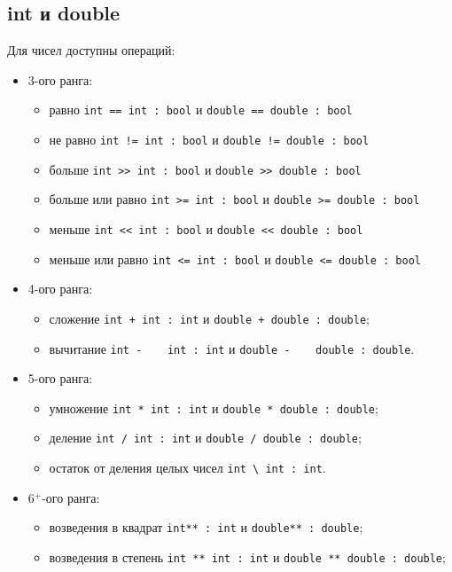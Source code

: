 \documentclass[a4paper, 14pt]{extarticle}
\newenvironment{icItems}
	{ \begin{itemize} [noitemsep,nolistsep] }
	{ \end{itemize} }
\begin{document}
\subsection{{\color{bluemarin}int} и {\color{bluemarin}double}}

	Для чисел доступны операций:
\begin{icItems}
	\item 3-ого ранга:
		\begin{icItems}
			\item равно \lstinline`int == int : bool` и \lstinline`double == double : bool`
			\item не равно \lstinline`int != int : bool` и \lstinline`double != double : bool`
			\item больше \lstinline`int >> int : bool` и \lstinline`double >> double : bool`
			\item больше или равно \lstinline`int >= int : bool` и \lstinline`double >= double : bool`
			\item меньше \lstinline`int << int : bool` и \lstinline`double << double : bool`
			\item меньше или равно \lstinline`int <= int : bool` и \lstinline`double <= double : bool`
		\end{icItems}
	\item 4-ого ранга:
		\begin{icItems}
			\item сложение \lstinline`int + int : int` и \lstinline`double + double : double`;
			\item вычитание \lstinline`int -    int : int` и \lstinline`double -    double : double`.
		\end{icItems}
	\item 5-ого ранга:
		\begin{icItems}
			\item умножение \lstinline`int * int : int` и \lstinline`double * double : double`;
			\item деление \lstinline`int / int : int` и \lstinline`double / double : double`;
			\item остаток от деления целых чисел \lstinline`int \ int : int`.
		\end{icItems}
	\item 6$^+$-ого ранга:
		\begin{icItems}
			\item возведения в квадрат \lstinline`int** : int` и \lstinline`double** : double`;
			\item возведения в степень \lstinline`int ** int : int` и \lstinline`double ** double : double`;

\end{icItems}
\end{icItems}
\end{document}
